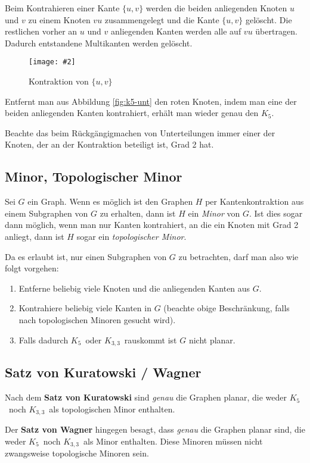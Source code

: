 \documentclass[10pt,a4paper]{article}
\makeatletter
\def\maxwidth#1{\ifdim\Gin@nat@width>#1 #1\else\Gin@nat@width\fi}
\newcommand{\imageFigure}[4]{%
    \begin{figure}[h]%
        \centering%
        {%
            \setlength{\fboxsep}{1pt}%
            \setlength{\fboxrule}{1pt}%
            \texttt{[image: \#2]}%
        }%
        \caption{#1}%
        \label{fig:#4}%
    \end{figure}%
}
\newcommand{\Kf}{$K_5$}
\newcommand{\Kdd}{$K_{3,3}$}
\makeatother
\begin{document}
Beim Kontrahieren einer Kante $\{u,v\}$ werden die beiden anliegenden Knoten $u$
und $v$ zu einem Knoten $vu$ zusammengelegt und die Kante $\{u,v\}$ gelöscht.
Die restlichen vorher an $u$ und $v$ anliegenden Kanten werden alle auf $vu$
übertragen.
Dadurch entstandene Multikanten werden gelöscht.

\imageFigure{Kontraktion von $\{u,v\}$}{kontr.png}{.7}{kontr}

Entfernt man aus Abbildung \ref{fig:k5-unt} den roten Knoten, indem man eine
der beiden anliegenden Kanten kontrahiert, erhält man wieder genau den \Kf.

Beachte das beim Rückgängigmachen von Unterteilungen immer einer der Knoten,
der an der Kontraktion beteiligt ist, Grad 2 hat.

\subsection{Minor, Topologischer Minor}
Sei $G$ ein Graph.
Wenn es möglich ist den Graphen $H$ per Kantenkontraktion aus einem Subgraphen
von $G$ zu erhalten, dann ist $H$ ein \textit{Minor} von $G$.
Ist dies sogar dann möglich, wenn man nur Kanten kontrahiert, an die ein Knoten
mit Grad 2 anliegt, dann ist $H$ sogar ein \textit{topologischer Minor}.

Da es erlaubt ist, nur einen Subgraphen von $G$ zu betrachten, darf man also
wie folgt vorgehen:
\begin{enumerate}
    \item Entferne beliebig viele Knoten und die anliegenden Kanten aus $G$.
    \item Kontrahiere beliebig viele Kanten in $G$ (beachte obige Beschränkung,
        falls nach topologischen Minoren gesucht wird).
    \item Falls dadurch \Kf~oder \Kdd~rauskommt ist $G$ nicht planar.
\end{enumerate}

\subsection{Satz von Kuratowski / Wagner}
Nach dem \textbf{Satz von Kuratowski} sind \textit{genau} die Graphen planar,
die weder \Kf~noch \Kdd~als topologischen Minor enthalten.

Der \textbf{Satz von Wagner} hingegen besagt, dass \textit{genau} die Graphen
planar sind, die weder \Kf~noch \Kdd~als Minor enthalten.
Diese Minoren müssen nicht zwangsweise topologische Minoren sein.
\end{document}
